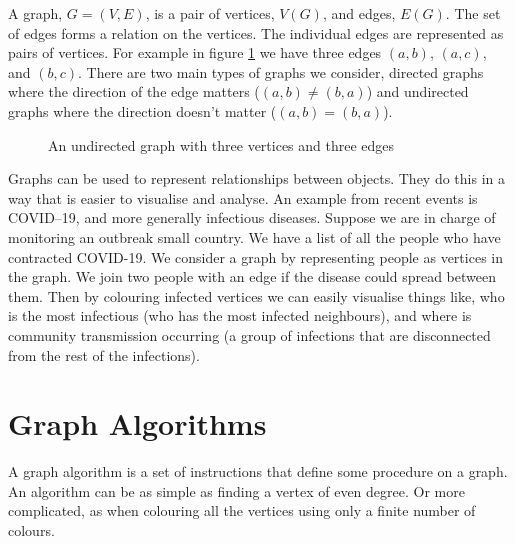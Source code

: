 A graph, $G=(V,E)$, is a pair of vertices, $V(G)$, and edges, $E(G)$. The set of edges forms a relation on the vertices. The individual edges are represented as pairs of vertices. For example in figure \ref{fig:k3} we have three edges $(a,b)$, $(a,c)$, and $(b,c)$. There are two main types of graphs we consider, directed graphs where the direction of the edge matters ($(a,b)\neq (b,a)$) and undirected graphs where the direction doesn't matter ($(a,b)=(b,a)$). 

\begin{figure}[h]
    \centering
{}
    \caption{An undirected graph with three vertices and three edges}
\label{fig:k3}
\end{figure}
   
Graphs can be used to represent relationships between objects. They do this in a way that is easier to visualise and analyse. An example from recent events is COVID--19, and more generally infectious diseases.  Suppose we are in charge of monitoring an outbreak small country. We have a list of all the people who have contracted COVID-19. We consider a graph by representing people as vertices in the graph. We join two people with an edge if the disease could spread between them.
Then by colouring infected vertices we can easily visualise things like, who is the most infectious (who has the most infected neighbours), and where is community transmission occurring (a group of infections that are disconnected from the rest of the infections).
  
\section{Graph Algorithms}
A graph algorithm is a set of instructions that define some procedure on a graph. An algorithm can be as simple as finding a vertex of even degree. Or more complicated, as when colouring all the vertices using only a finite number of colours.  

